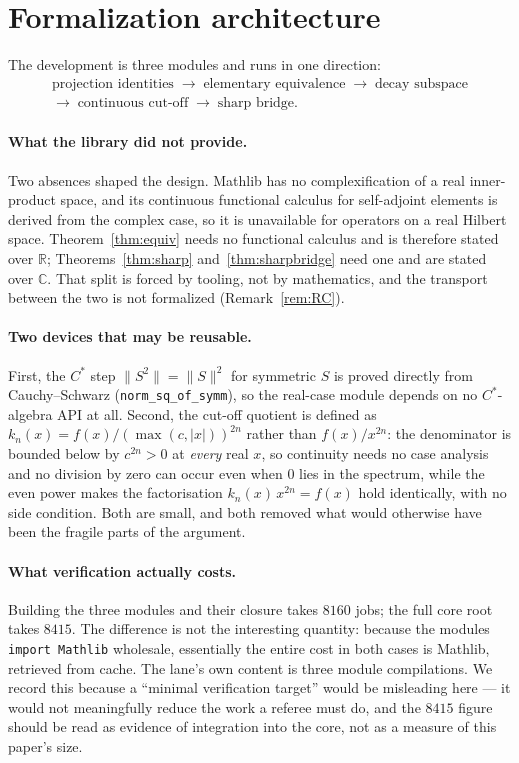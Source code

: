 \documentclass[11pt]{article}
\theoremstyle{definition}
\newcommand{\lean}[1]{\texttt{#1}}
\newcommand{\R}{\mathbb{R}}
\newcommand{\C}{\mathbb{C}}
\begin{document}
\section{Formalization architecture}
\label{sec:arch}

The development is three modules and runs in one direction:
\begin{gather*}
\text{projection identities}
\;\to\;
\text{elementary equivalence}
\;\to\;
\text{decay subspace}\\
\to\;
\text{continuous cut-off}
\;\to\;
\text{sharp bridge.}
\end{gather*}

\paragraph{What the library did not provide.}  Two absences shaped the
design.  Mathlib has no complexification of a real inner-product space,
and its continuous functional calculus for self-adjoint elements is
derived from the complex case, so it is unavailable for operators on a
real Hilbert space.  Theorem~\ref{thm:equiv} needs no functional
calculus and is therefore stated over $\R$; Theorems~\ref{thm:sharp}
and~\ref{thm:sharpbridge} need one and are stated over $\C$.  That split
is forced by tooling, not by mathematics, and the transport between the
two is not formalized (Remark~\ref{rem:RC}).

\paragraph{Two devices that may be reusable.}  First, the $C^*$ step
$\|S^2\| = \|S\|^2$ for symmetric $S$ is proved directly from
Cauchy--Schwarz (\lean{norm\_sq\_of\_symm}), so the real-case module
depends on no $C^*$-algebra API at all.  Second, the cut-off quotient is
defined as
$k_n(x) = f(x)/(\max(c,|x|))^{2n}$ rather than $f(x)/x^{2n}$: the
denominator is bounded below by $c^{2n} > 0$ at \emph{every} real $x$, so
continuity needs no case analysis and no division by zero can occur even
when $0$ lies in the spectrum, while the even power makes the
factorisation $k_n(x)\,x^{2n} = f(x)$ hold identically, with no side
condition.  Both are small, and both removed what would otherwise have
been the fragile parts of the argument.

\paragraph{What verification actually costs.}  Building the three modules
and their closure takes $8160$ jobs; the full core root takes $8415$.  The
difference is not the interesting quantity: because the modules
\lean{import Mathlib} wholesale, essentially the entire cost in both cases
is Mathlib, retrieved from cache.  The lane's own content is three module
compilations.  We record this because a ``minimal verification target''
would be misleading here --- it would not meaningfully reduce the work a
referee must do, and the $8415$ figure should be read as evidence of
integration into the core, not as a measure of this paper's size.
\end{document}
